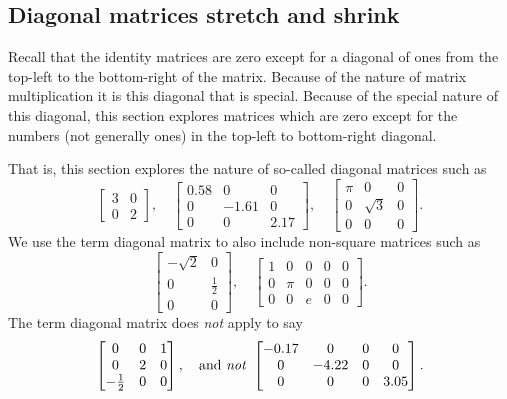 \subsection{Diagonal matrices stretch and shrink}
\label{sec:dmd}

Recall that the identity matrices are zero except for a diagonal of ones from the top-left to the bottom-right of the matrix.
Because of the nature of matrix multiplication it is this diagonal that is special.
Because of the special nature of this diagonal, this section explores matrices which are zero except for the numbers (not generally ones) in the top-left to bottom-right diagonal.

\begin{example} \label{eg:4diag}
That is, this section explores the nature of so-called diagonal matrices such as
\begin{equation*}
\begin{bmatrix} 3&0\\0&2 \end{bmatrix},\quad
\begin{bmatrix} 0.58&0&0\\0&-1.61&0\\0&0&2.17 \end{bmatrix},\quad
\begin{bmatrix} \pi&0&0\\0&\sqrt3&0\\0&0&0 \end{bmatrix}.
\end{equation*}
We use the term {diagonal matrix} to also include non-square matrices such as
\begin{equation*}
\begin{bmatrix} -\sqrt2&0\\0&\frac12\\0&0 \end{bmatrix},\quad
\begin{bmatrix} 1&0&0&0&0\\0&\pi&0&0&0\\0&0&e&0&0 \end{bmatrix}.
\end{equation*}
The term diagonal matrix does \emph{not} apply to say
\begin{equation*}
\begin{bmatrix} 0&0&1\\0&2&0\\-\frac12&0&0  \end{bmatrix}
,\quad\text{and \emph{not} }
\begin{bmatrix} -0.17&0&0&0\\0&-4.22&0&0\\0&0&0&3.05 \end{bmatrix}.
\end{equation*}
\end{example}

